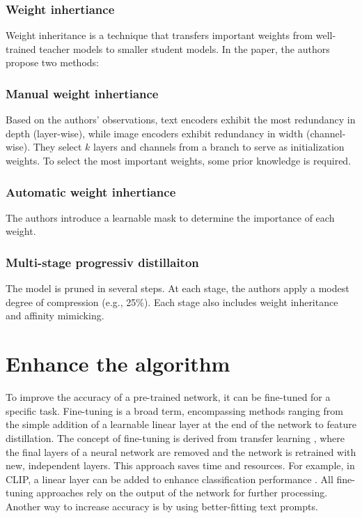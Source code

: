         \subsubsection{Weight inhertiance
        \label{section:weightinheritance}}
        Weight inheritance is a technique that transfers important weights from well-trained teacher models to smaller student models. 
        In the paper, the authors propose two methods:
        

        \subsubsection{Manual weight inhertiance}
        Based on the authors' observations, text encoders exhibit the most redundancy in depth (layer-wise), while image encoders exhibit redundancy in width (channel-wise). 
        They select \(k\) layers and channels from a branch to serve as initialization weights. 
        To select the most important weights, some prior knowledge is required.
        
        \subsubsection{Automatic weight inhertiance}
        The authors introduce a learnable mask to determine the importance of each weight.

        \subsubsection{Multi-stage progressiv distillaiton}
        The model is pruned in several steps. 
        At each stage, the authors apply a modest degree of compression (e.g., 25\%). Each stage also includes weight inheritance and affinity mimicking.
        

\section{Enhance the algorithm
    \label{section:enhancealgorithm}}

    To improve the accuracy of a pre-trained network, it can be fine-tuned for a specific task. 
    Fine-tuning is a broad term, encompassing methods ranging from the simple addition of a learnable linear layer at the end of the network to feature distillation. 
    The concept of fine-tuning is derived from transfer learning \cite{transferlearning}, where the final layers of a neural network are removed and the network is retrained with new, independent layers. 
    This approach saves time and resources. 
    For example, in CLIP, a linear layer can be added to enhance classification performance \cite{finetuneclip}. 
    All fine-tuning approaches rely on the output of the network for further processing. 
    Another way to increase accuracy is by using better-fitting text prompts.
    
